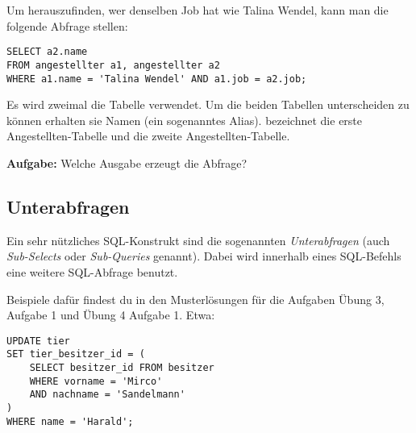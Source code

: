 Um herauszufinden, wer denselben Job hat wie Talina Wendel, kann man die folgende Abfrage stellen:

\begin{lstlisting}
SELECT a2.name
FROM angestellter a1, angestellter a2
WHERE a1.name = 'Talina Wendel' AND a1.job = a2.job;
\end{lstlisting}

Es wird zweimal die Tabelle  verwendet. Um die beiden
Tabellen unterscheiden zu können erhalten sie Namen (ein sogenanntes Alias).
 bezeichnet die erste Angestellten-Tabelle und 
die zweite Angestellten-Tabelle.

\textbf{Aufgabe:} Welche Ausgabe erzeugt die Abfrage?


\subsection{Unterabfragen}

Ein sehr nützliches SQL-Konstrukt sind die sogenannten \emph{Unterabfragen}
(auch \emph{Sub-Selects} oder \emph{Sub-Queries} genannt). Dabei wird
innerhalb eines SQL-Befehls eine weitere SQL-Abfrage benutzt.

Beispiele dafür findest du in den Musterlösungen für die Aufgaben Übung 3,
Aufgabe 1 und Übung 4 Aufgabe 1. Etwa:

\begin{lstlisting}
UPDATE tier
SET tier_besitzer_id = (
    SELECT besitzer_id FROM besitzer
    WHERE vorname = 'Mirco'
    AND nachname = 'Sandelmann'
)
WHERE name = 'Harald';
\end{lstlisting}
